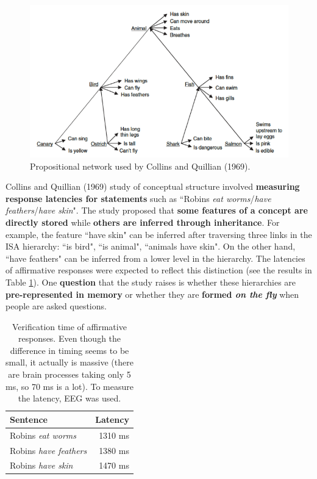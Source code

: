 \begin{figure}
    \centering
    \includegraphics[width=0.7\linewidth]{images/animal_pn.png}
    \caption{Propositional network used by Collins and Quillian (1969).}
    \label{fig:animal_pn}
\end{figure}
Collins and Quillian (1969) study of conceptual structure involved \textbf{measuring response latencies for statements} such as ``Robins \textit{eat worms}/\textit{have feathers}/\textit{have skin}". The study proposed that \textbf{some features of a concept are directly stored} while \textbf{others are inferred through inheritance}. For example, the feature ``have skin" can be inferred after traversing three links in the ISA hierarchy: ``is bird", ``is animal", ``animals have skin". On the other hand, ``have feathers" can be inferred from a lower level in the hierarchy.
The latencies of affirmative responses were expected to reflect this distinction (see the results in Table \ref{tab:collins}). One \textbf{question} that the study raises is whether these hierarchies are \textbf{pre-represented in memory} or whether they are \textbf{formed \textit{on the fly}} when people are asked questions.\\

\begin{table}[t]
    \centering
    \captionsetup{width=.8\linewidth}
    \begin{tabular}{lr}
        \hline
        Sentence & Latency \\
        \hline
        Robins \textit{eat worms} & 1310 ms \\
        Robins \textit{have feathers} & 1380 ms \\
        Robins \textit{have skin} & 1470 ms \\
        \hline
    \end{tabular}
    \caption{Verification time of affirmative responses. Even though the difference in timing seems to be small, it actually is massive (there are brain processes taking only 5 ms, so 70 ms is a lot). To measure the latency, EEG was used.}
    \label{tab:collins}
\end{table}

